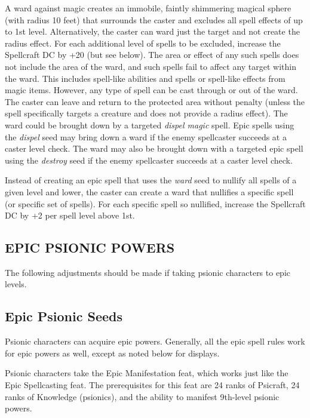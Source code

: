 \documentclass{article}
\begin{document}
A ward against magic creates an immobile, faintly shimmering magical sphere (with 
radius 10 feet) that surrounds the caster and excludes all spell effects of up 
to 1st level. Alternatively, the caster can ward just the target and not create 
the radius effect. For each additional level of spells to be excluded, increase 
the Spellcraft DC by +20 (but see below). The area or effect of any such spells 
does not include the area of the ward, and such spells fail to affect any target 
within the ward. This includes spell-like abilities and spells or spell-like effects 
from magic items. However, any type of spell can be cast through or out of the 
ward. The caster can leave and return to the protected area without penalty (unless 
the spell specifically targets a creature and does not provide a radius effect). 
The ward could be brought down by a targeted \textit{dispel magic }spell. Epic 
spells using the \textit{dispel }seed may bring down a ward if the enemy spellcaster 
succeeds at a caster level check. The ward may also be brought down with a targeted 
epic spell using the \textit{destroy }seed if the enemy spellcaster succeeds at 
a caster level check. 

Instead of creating an epic spell that uses the \textit{ward }seed to nullify all 
spells of a given level and lower, the caster can create a ward that nullifies 
a specific spell (or specific set of spells). For each specific spell so nullified, 
increase the Spellcraft DC by +2 per spell level above 1st. 

\vspace{12pt}
\subsection*{{\LARGE{}EPIC PSIONIC POWERS }}

The following adjustments should be made if taking psionic characters to epic levels. 

\vspace{12pt}
\subsection*{Epic Psionic Seeds }

Psionic characters can acquire epic powers.  Generally, all the epic spell rules 
work for epic powers as well, except as noted below for displays.

Psionic characters take the Epic Manifestation feat, which works just like the 
Epic Spellcasting feat. The prerequisites for this feat are 24 ranks of Psicraft, 
24 ranks of Knowledge (psionics), and the ability to manifest 9th-level psionic 
powers. 
\end{document}
